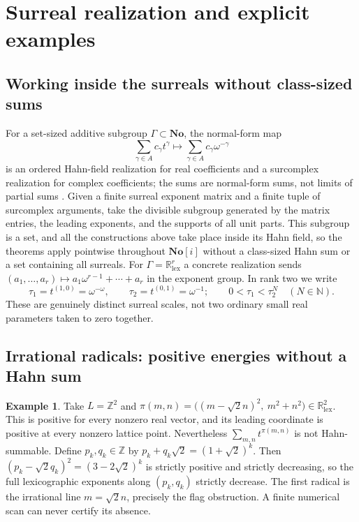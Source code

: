 \documentclass[11pt,letterpaper]{article}
\theoremstyle{definition}
\newtheorem{example}[example]{Example}
\newcommand{\R}{\mathbb R}
\newcommand{\Z}{\mathbb Z}
\newcommand{\N}{\mathbb N}
\newcommand{\No}{\mathbf{No}}
\newcommand{\lex}{\mathrm{lex}}
\begin{document}
\section{Surreal realization and explicit examples}\label{tate:theta:sec:examples}

\subsection{Working inside the surreals without class-sized sums}

For a set-sized additive subgroup $\Gamma\subset\No$, the normal-form map
\begin{equation}
 \sum_{\gamma\in A}c_\gamma t^\gamma\longmapsto
 \sum_{\gamma\in A}c_\gamma\omega^{-\gamma}\label{tate:theta:eq:normalembedding}
\end{equation}
is an ordered Hahn-field realization for real coefficients and a
surcomplex realization for complex coefficients; the sums are normal-form
sums, not limits of partial sums \cite{BournezGuilmant}. Given a finite
surreal exponent matrix and a finite tuple of surcomplex arguments, take the
divisible subgroup generated by the matrix entries, the leading exponents,
and the supports of all unit parts. This subgroup is a set, and all the
constructions above take place inside its Hahn field, so the theorems apply
pointwise throughout $\No[i]$ without a class-sized Hahn sum or a set
containing all surreals. For $\Gamma=\R^r_{\lex}$ a concrete realization
sends $(a_1,\ldots,a_r)\mapsto a_1\omega^{r-1}+\cdots+a_r$ in the exponent
group. In rank two we write
\[
 \tau_1=t^{(1,0)}=\omega^{-\omega},\qquad
 \tau_2=t^{(0,1)}=\omega^{-1};\qquad
 0<\tau_1<\tau_2^N\quad(N\in\N).
\]
These are genuinely distinct surreal scales, not two ordinary small real
parameters taken to zero together.

\subsection{Irrational radicals: positive energies without a Hahn sum}

\begin{example}\label{tate:theta:ex:irrational}
Take $L=\Z^2$ and $\pi(m,n)=\bigl((m-\sqrt2n)^2,\ m^2+n^2\bigr)\in\R^2_{\lex}$.
This is positive for every nonzero real vector, and its leading coordinate
is positive at every nonzero lattice point. Nevertheless
$\sum_{m,n}t^{\pi(m,n)}$ is not Hahn-summable. Define $p_k,q_k\in\Z$ by
$p_k+q_k\sqrt2=(1+\sqrt2)^k$. Then $(p_k-\sqrt2q_k)^2=(3-2\sqrt2)^k$ is
strictly positive and strictly decreasing, so the full lexicographic
exponents along $(p_k,q_k)$ strictly decrease. The first radical is the
irrational line $m=\sqrt2n$, precisely the flag obstruction. A finite
numerical scan can never certify its absence.
\end{example}
\end{document}

